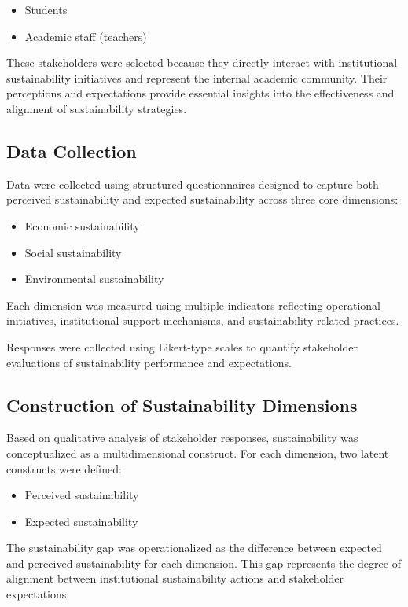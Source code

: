 \documentclass[11pt,a4paper]{article}
\begin{document}
\begin{itemize}
\item Students
\item Academic staff (teachers)
\end{itemize}

These stakeholders were selected because they directly interact with institutional sustainability initiatives and represent the internal academic community. Their perceptions and expectations provide essential insights into the effectiveness and alignment of sustainability strategies.

\subsection{Data Collection}

Data were collected using structured questionnaires designed to capture both perceived sustainability and expected sustainability across three core dimensions:

\begin{itemize}
\item Economic sustainability
\item Social sustainability
\item Environmental sustainability
\end{itemize}

Each dimension was measured using multiple indicators reflecting operational initiatives, institutional support mechanisms, and sustainability-related practices.

Responses were collected using Likert-type scales to quantify stakeholder evaluations of sustainability performance and expectations.

\subsection{Construction of Sustainability Dimensions}

Based on qualitative analysis of stakeholder responses, sustainability was conceptualized as a multidimensional construct. For each dimension, two latent constructs were defined:

\begin{itemize}
\item Perceived sustainability
\item Expected sustainability
\end{itemize}

The sustainability gap was operationalized as the difference between expected and perceived sustainability for each dimension. This gap represents the degree of alignment between institutional sustainability actions and stakeholder expectations.
\end{document}

